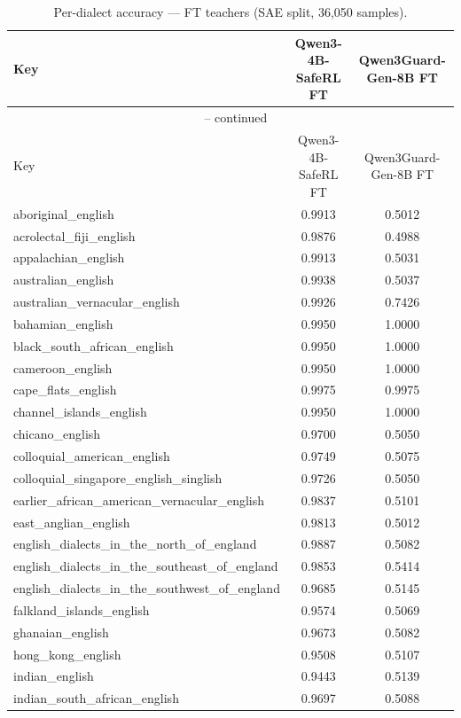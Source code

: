 \begin{landscape}
\begin{longtable}{lcc}
\caption{Per-dialect accuracy — FT teachers (SAE split, 36{,}050 samples).} \\
\label{tab:ft_teachers_per_dialect_sae}
\toprule
Key & Qwen3-4B-SafeRL FT & Qwen3Guard-Gen-8B FT \\
\midrule
\endfirsthead
\multicolumn{3}{c}{\tablename\ \thetable{} -- continued} \\
\toprule
Key & Qwen3-4B-SafeRL FT & Qwen3Guard-Gen-8B FT \\
\midrule
\endhead
aboriginal\_english & 0.9913 & 0.5012 \\
acrolectal\_fiji\_english & 0.9876 & 0.4988 \\
appalachian\_english & 0.9913 & 0.5031 \\
australian\_english & 0.9938 & 0.5037 \\
australian\_vernacular\_english & 0.9926 & 0.7426 \\
bahamian\_english & 0.9950 & 1.0000 \\
black\_south\_african\_english & 0.9950 & 1.0000 \\
cameroon\_english & 0.9950 & 1.0000 \\
cape\_flats\_english & 0.9975 & 0.9975 \\
channel\_islands\_english & 0.9950 & 1.0000 \\
chicano\_english & 0.9700 & 0.5050 \\
colloquial\_american\_english & 0.9749 & 0.5075 \\
colloquial\_singapore\_english\_singlish & 0.9726 & 0.5050 \\
earlier\_african\_american\_vernacular\_english & 0.9837 & 0.5101 \\
east\_anglian\_english & 0.9813 & 0.5012 \\
english\_dialects\_in\_the\_north\_of\_england & 0.9887 & 0.5082 \\
english\_dialects\_in\_the\_southeast\_of\_england & 0.9853 & 0.5414 \\
english\_dialects\_in\_the\_southwest\_of\_england & 0.9685 & 0.5145 \\
falkland\_islands\_english & 0.9574 & 0.5069 \\
ghanaian\_english & 0.9673 & 0.5082 \\
hong\_kong\_english & 0.9508 & 0.5107 \\
indian\_english & 0.9443 & 0.5139 \\
indian\_south\_african\_english & 0.9697 & 0.5088 \\

\end{longtable}
\end{landscape}
